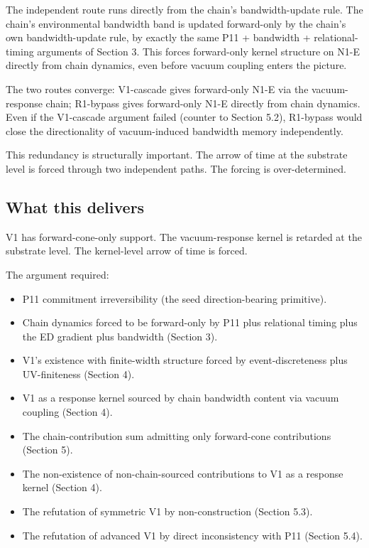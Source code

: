 \documentclass[11pt,a4paper]{article}
\begin{document}
The independent route runs directly from the chain's bandwidth-update rule. The chain's environmental bandwidth band is updated forward-only by the chain's own bandwidth-update rule, by exactly the same P11 + bandwidth + relational-timing arguments of Section 3. This forces forward-only kernel structure on N1-E directly from chain dynamics, even before vacuum coupling enters the picture.

The two routes converge: V1-cascade gives forward-only N1-E via the vacuum-response chain; R1-bypass gives forward-only N1-E directly from chain dynamics. Even if the V1-cascade argument failed (counter to Section 5.2), R1-bypass would close the directionality of vacuum-induced bandwidth memory independently.

This redundancy is structurally important. The arrow of time at the substrate level is forced through two independent paths. The forcing is over-determined.

\subsection{What this delivers}

V1 has forward-cone-only support. The vacuum-response kernel is retarded at the substrate level. The kernel-level arrow of time is forced.

The argument required:
\begin{itemize}[noitemsep]
  \item P11 commitment irreversibility (the seed direction-bearing primitive).
  \item Chain dynamics forced to be forward-only by P11 plus relational timing plus the ED gradient plus bandwidth (Section 3).
  \item V1's existence with finite-width structure forced by event-discreteness plus UV-finiteness (Section 4).
  \item V1 as a response kernel sourced by chain bandwidth content via vacuum coupling (Section 4).
  \item The chain-contribution sum admitting only forward-cone contributions (Section 5).
  \item The non-existence of non-chain-sourced contributions to V1 as a response kernel (Section 4).
  \item The refutation of symmetric V1 by non-construction (Section 5.3).
  \item The refutation of advanced V1 by direct inconsistency with P11 (Section 5.4).
\end{itemize}
\end{document}
